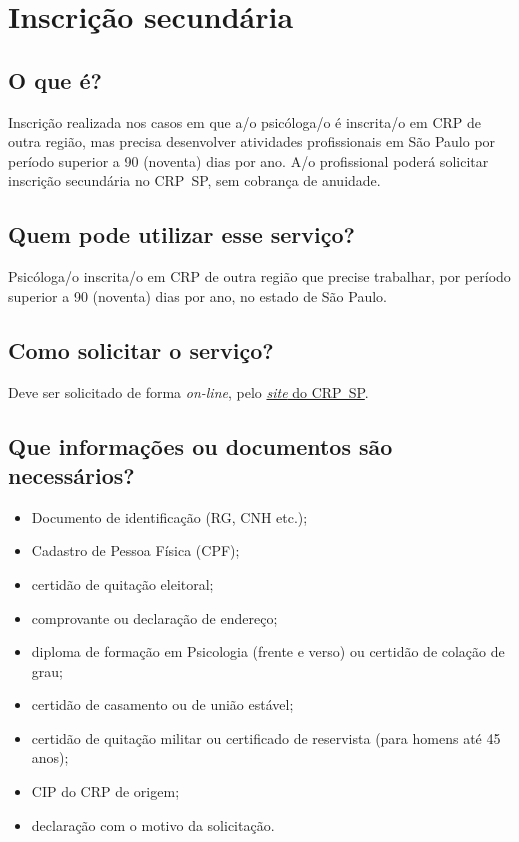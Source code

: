 \chapter{Inscrição secundária}
\label{chap:pf-secundaria}

\section{O que é?}

Inscrição realizada nos casos em que a/o psicóloga/o é inscrita/o em CRP de outra região, mas precisa desenvolver atividades profissionais em São Paulo por período superior a 90 (noventa) dias por ano. A/o profissional poderá solicitar inscrição secundária no CRP~SP, sem cobrança de anuidade.

\section{Quem pode utilizar esse serviço?}

Psicóloga/o inscrita/o em CRP de outra região que precise trabalhar, por período superior a 90 (noventa) dias por ano, no estado de São Paulo.

\section{Como solicitar o serviço?}

Deve ser solicitado de forma \emph{on-line}, pelo \href{https://www.crpsp.org/pagina/view/338}{\emph{site} do CRP~SP}.

\section{Que informações ou documentos são necessários?}

\begin{itemize}
	\item
	Documento de identificação (RG, CNH etc.);
	\item
	Cadastro de Pessoa Física (CPF);
	\item
	certidão de quitação eleitoral;
	\item
	comprovante ou declaração de endereço;
	\item
	diploma de formação em Psicologia (frente e verso) ou certidão de
	colação de grau;
	\item
	certidão de casamento ou de união estável;
	\item
	certidão de quitação militar ou certificado de reservista (para homens
	até 45 anos);
	\item
	CIP do CRP de origem;
	\item
	declaração com o motivo da solicitação.
\end{itemize}


